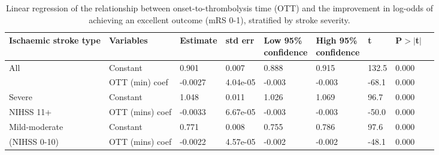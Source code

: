 \begin{table}[!ht]
    \caption{Linear regression of the relationship between onset-to-thrombolysis time (OTT) and the improvement in log-odds of achieving an excellent outcome (mRS 0-1), stratified by stroke severity.}
    \centering
    \begin{tabular}{lllllllll}
    \toprule
    Ischaemic stroke type & Variables & Estimate&  std err & \makecell{Low 95\%\\confidence} & \makecell{High 95\%\\confidence} & t & P$>$$|$t$|$ \\
    \midrule
    All & Constant & 0.901 & 0.007 & 0.888 & 0.915 & 132.5 & 0.000 \\
        & OTT (min) coef & -0.0027 & 4.04e-05 & -0.003 & -0.003 & -68.1 & 0.000 \\
    \midrule
    Severe & Constant & 1.048 & 0.011 & 1.026 & 1.069 & 96.7 & 0.000 \\
    NIHSS 11+ & OTT (mins) coef & -0.0033 & 6.67e-05 & -0.003 & -0.003 & -50.0 & 0.000 \\
    \midrule
    Mild-moderate & Constant & 0.771 & 0.008 & 0.755 & 0.786 & 97.6 & 0.000 \\
    (NIHSS 0-10) & OTT (mins) coef & -0.0022 & 4.57e-05 & -0.002 & -0.002 & -48.1 & 0.000 \\
    \bottomrule
    \end{tabular}
    \label{tab:stats_table_mrs1}
\end{table}


\FloatBarrier
